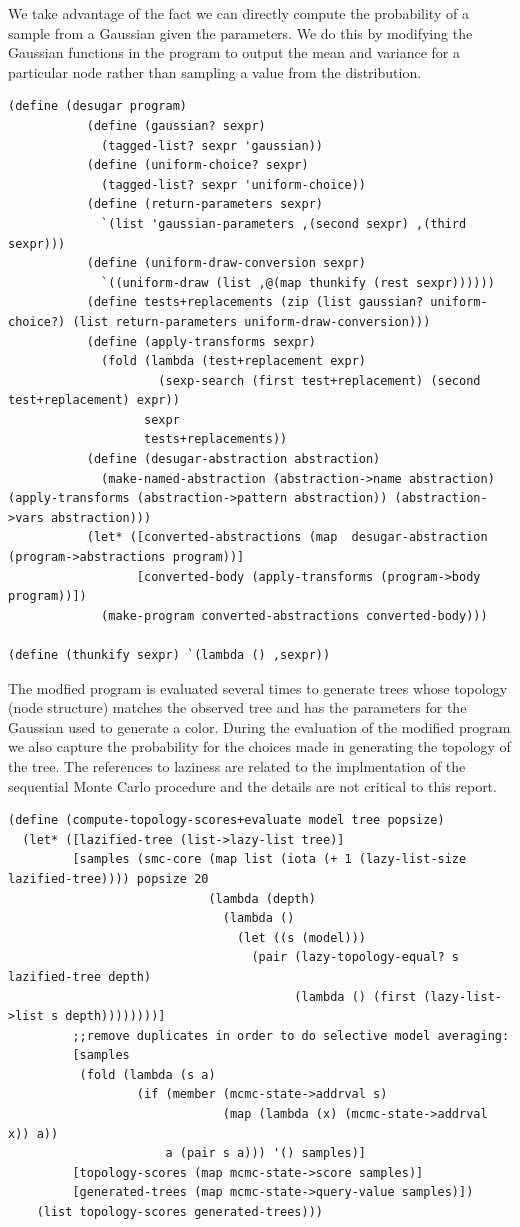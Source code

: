 \documentclass[a4paper,10pt]{article}
\begin{document}
We take advantage of the fact we can directly compute the probability of a sample from a Gaussian given the parameters.  We do this by modifying the Gaussian functions in the program to output the mean and variance for a particular node rather than sampling a value from the distribution.
\begin{lstlisting}[frame=trBL]
(define (desugar program)
           (define (gaussian? sexpr)
             (tagged-list? sexpr 'gaussian))
           (define (uniform-choice? sexpr)
             (tagged-list? sexpr 'uniform-choice))
           (define (return-parameters sexpr)
             `(list 'gaussian-parameters ,(second sexpr) ,(third sexpr)))
           (define (uniform-draw-conversion sexpr)
             `((uniform-draw (list ,@(map thunkify (rest sexpr))))))
           (define tests+replacements (zip (list gaussian? uniform-choice?) (list return-parameters uniform-draw-conversion)))
           (define (apply-transforms sexpr)
             (fold (lambda (test+replacement expr)
                     (sexp-search (first test+replacement) (second test+replacement) expr))
                   sexpr
                   tests+replacements))
           (define (desugar-abstraction abstraction)
             (make-named-abstraction (abstraction->name abstraction) (apply-transforms (abstraction->pattern abstraction)) (abstraction->vars abstraction)))
           (let* ([converted-abstractions (map  desugar-abstraction (program->abstractions program))]
                  [converted-body (apply-transforms (program->body program))])
             (make-program converted-abstractions converted-body)))

(define (thunkify sexpr) `(lambda () ,sexpr))
\end{lstlisting}
The modfied program is evaluated several times to generate trees whose topology (node structure) matches the observed tree and has the parameters for the Gaussian used to generate a color.  During the evaluation of the modified program we also capture the probability for the choices made in generating the topology of the tree.  The references to laziness are related to the implmentation of the sequential Monte Carlo procedure and the details are not critical to this report.
\begin{lstlisting}[frame=trBL]
(define (compute-topology-scores+evaluate model tree popsize)
  (let* ([lazified-tree (list->lazy-list tree)]
         [samples (smc-core (map list (iota (+ 1 (lazy-list-size  lazified-tree)))) popsize 20
                            (lambda (depth)
                              (lambda ()
                                (let ((s (model)))
                                  (pair (lazy-topology-equal? s lazified-tree depth)
                                        (lambda () (first (lazy-list->list s depth))))))))]
         ;;remove duplicates in order to do selective model averaging:
         [samples
          (fold (lambda (s a)
                  (if (member (mcmc-state->addrval s)
                              (map (lambda (x) (mcmc-state->addrval x)) a))
                      a (pair s a))) '() samples)]
         [topology-scores (map mcmc-state->score samples)]
         [generated-trees (map mcmc-state->query-value samples)])
    (list topology-scores generated-trees)))
\end{lstlisting}
\end{document}
